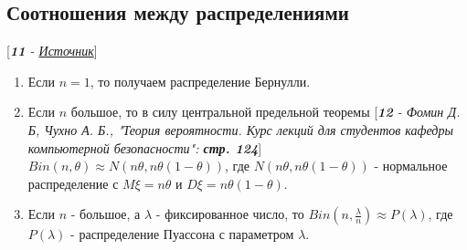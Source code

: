 \documentclass[14pt,a4paper,oneside]{extbook}
\begin{document}
    \subsection{Соотношения между распределениями} [\textit{\textbf{11} - \href{https://ru.wikipedia.org/wiki/Биномиальное_распределение#Связь_с_другими_распределениями}{Источник}}]
    \begin{enumerate}
        \item Если $n = 1$, то получаем распределение Бернулли.
        \item Если $n$ большое, то в силу центральной предельной теоремы [\textit{\textbf{12} - Фомин Д. Б, Чухно А. Б., "Теория вероятности. Курс лекций для студентов кафедры компьютерной безопасности": \textbf{стр. 124}}] \\ $Bin(n, \theta) \approx N(n\theta, n\theta(1-\theta))$, где $N(n\theta, n\theta(1-\theta))$ - нормальное распределение с $M\xi = n\theta$ и $D\xi = n\theta(1-\theta)$.
        \item Если $n$ - большое, а $\lambda$ - фиксированное число, то $Bin(n, \frac{\lambda}{n}) \approx P(\lambda)$, где $P(\lambda)$ - распределение Пуассона с параметром $\lambda$. 
    \end{enumerate}
    
\end{document}
